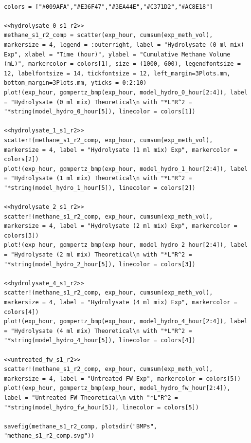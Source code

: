 \documentclass[11pt]{article}
\begin{document}
\begin{verbatim}

colors = ["#009AFA","#E36F47","#3EA44E","#C371D2","#AC8E18"]

<<hydrolysate_0_s1_r2>>
methane_s1_r2_comp = scatter(exp_hour, cumsum(exp_meth_vol), markersize = 4, legend = :outerright, label = "Hydrolysate (0 ml mix) Exp", xlabel = "Time (hour)", ylabel = "Cumulative Methane Volume (mL)", markercolor = colors[1], size = (1000, 600), legendfontsize = 12, labelfontsize = 14, tickfontsize = 12, left_margin=3Plots.mm,  bottom_margin=3Plots.mm, yticks = 0:2:10)
plot!(exp_hour, gompertz_bmp(exp_hour, model_hydro_0_hour[2:4]), label = "Hydrolysate (0 ml mix) Theoretical\n with "*L"R^2 = "*string(model_hydro_0_hour[5]), linecolor = colors[1])

<<hydrolysate_1_s1_r2>>
scatter!(methane_s1_r2_comp, exp_hour, cumsum(exp_meth_vol), markersize = 4, label = "Hydrolysate (1 ml mix) Exp", markercolor = colors[2])
plot!(exp_hour, gompertz_bmp(exp_hour, model_hydro_1_hour[2:4]), label = "Hydrolysate (1 ml mix) Theoretical\n with "*L"R^2 = "*string(model_hydro_1_hour[5]), linecolor = colors[2])

<<hydrolysate_2_s1_r2>>
scatter!(methane_s1_r2_comp, exp_hour, cumsum(exp_meth_vol), markersize = 4, label = "Hydrolysate (2 ml mix) Exp", markercolor = colors[3])
plot!(exp_hour, gompertz_bmp(exp_hour, model_hydro_2_hour[2:4]), label = "Hydrolysate (2 ml mix) Theoretical\n with "*L"R^2 = "*string(model_hydro_2_hour[5]), linecolor = colors[3])

<<hydrolysate_4_s1_r2>>
scatter!(methane_s1_r2_comp, exp_hour, cumsum(exp_meth_vol), markersize = 4, label = "Hydrolysate (4 ml mix) Exp", markercolor = colors[4])
plot!(exp_hour, gompertz_bmp(exp_hour, model_hydro_4_hour[2:4]), label = "Hydrolysate (4 ml mix) Theoretical\n with "*L"R^2 = "*string(model_hydro_4_hour[5]), linecolor = colors[4])

<<untreated_fw_s1_r2>>
scatter!(methane_s1_r2_comp, exp_hour, cumsum(exp_meth_vol), markersize = 4, label = "Untreated FW Exp", markercolor = colors[5])
plot!(exp_hour, gompertz_bmp(exp_hour, model_hydro_fw_hour[2:4]), label = "Untreated FW Theoretical\n with "*L"R^2 = "*string(model_hydro_fw_hour[5]), linecolor = colors[5])

savefig(methane_s1_r2_comp, plotsdir("BMPs", "methane_s1_r2_comp.svg"))
\end{verbatim}
\end{document}
